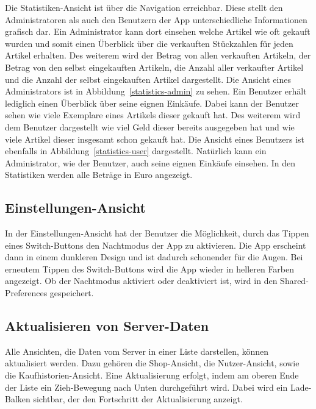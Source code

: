Die Statistiken-Ansicht ist über die Navigation erreichbar.
Diese stellt den Administratoren als auch den Benutzern der App unterschiedliche Informationen grafisch dar.
Ein Administrator kann dort einsehen welche Artikel wie oft gekauft wurden und somit einen Überblick über die verkauften Stückzahlen für jeden Artikel erhalten.
Des weiterem wird der Betrag von allen verkauften Artikeln, der Betrag von den selbst eingekauften Artikeln, die Anzahl aller verkaufter Artikel und die Anzahl der selbst eingekauften Artikel dargestellt.
Die Ansicht eines Administrators ist in Abbildung~\ref{statistics-admin} zu sehen.
Ein Benutzer erhält lediglich einen Überblick über seine eignen Einkäufe.
Dabei kann der Benutzer sehen wie viele Exemplare eines Artikels dieser gekauft hat.
Des weiterem wird dem Benutzer dargestellt wie viel Geld dieser bereits ausgegeben hat und wie viele Artikel dieser insgesamt schon gekauft hat.
Die Ansicht eines Benutzers ist ebenfalls in Abbildung~\ref{statistics-user} dargestellt.
Natürlich kann ein Administrator, wie der Benutzer, auch seine eignen Einkäufe einsehen.
In den Statistiken werden alle Beträge in Euro angezeigt.


\subsection{Einstellungen-Ansicht} \label{subsec:settings-screen}

In der Einstellungen-Ansicht hat der Benutzer die Möglichkeit, durch das Tippen eines Switch-Buttons den Nachtmodus der App zu aktivieren.
Die App erscheint dann in einem dunkleren Design und ist dadurch schonender für die Augen.
Bei erneutem Tippen des Switch-Buttons wird die App wieder in helleren Farben angezeigt.
Ob der Nachtmodus aktiviert oder deaktiviert ist, wird in den Shared-Preferences gespeichert.

\subsection{Aktualisieren von Server-Daten}\label{subsec:aktualisieren-von-server-daten}

Alle Ansichten, die Daten vom Server in einer Liste darstellen, können aktualisiert werden.
Dazu gehören die Shop-Ansicht, die Nutzer-Ansicht, sowie die Kaufhistorien-Ansicht.
Eine Aktualisierung erfolgt, indem am oberen Ende der Liste ein Zieh-Bewegung nach Unten durchgeführt wird.
Dabei wird ein Lade-Balken sichtbar, der den Fortschritt der Aktualisierung anzeigt.

